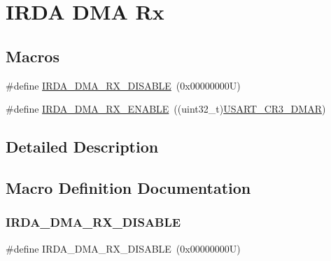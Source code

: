 \hypertarget{group___i_r_d_a___d_m_a___rx}{}\section{I\+R\+DA D\+MA Rx}
\label{group___i_r_d_a___d_m_a___rx}
\subsection*{Macros}
\begin{DoxyCompactItemize}
\item 
\#define \hyperlink{group___i_r_d_a___d_m_a___rx_ga81e25c2dd20eec53aecead5923723c0c}{I\+R\+D\+A\+\_\+\+D\+M\+A\+\_\+\+R\+X\+\_\+\+D\+I\+S\+A\+B\+LE}~(0x00000000\+U)
\item 
\#define \hyperlink{group___i_r_d_a___d_m_a___rx_gab5de34cac5f5672f882670d7608241ed}{I\+R\+D\+A\+\_\+\+D\+M\+A\+\_\+\+R\+X\+\_\+\+E\+N\+A\+B\+LE}~((uint32\+\_\+t)\hyperlink{group___peripheral___registers___bits___definition_gaff130f15493c765353ec2fd605667c5a}{U\+S\+A\+R\+T\+\_\+\+C\+R3\+\_\+\+D\+M\+AR})
\end{DoxyCompactItemize}


\subsection{Detailed Description}


\subsection{Macro Definition Documentation}
\mbox{\label{group___i_r_d_a___d_m_a___rx_ga81e25c2dd20eec53aecead5923723c0c}} 
\subsubsection{\texorpdfstring{I\+R\+D\+A\+\_\+\+D\+M\+A\+\_\+\+R\+X\+\_\+\+D\+I\+S\+A\+B\+LE}{IRDA\_DMA\_RX\_DISABLE}}
{\footnotesize\ttfamily \#define I\+R\+D\+A\+\_\+\+D\+M\+A\+\_\+\+R\+X\+\_\+\+D\+I\+S\+A\+B\+LE~(0x00000000\+U)}

